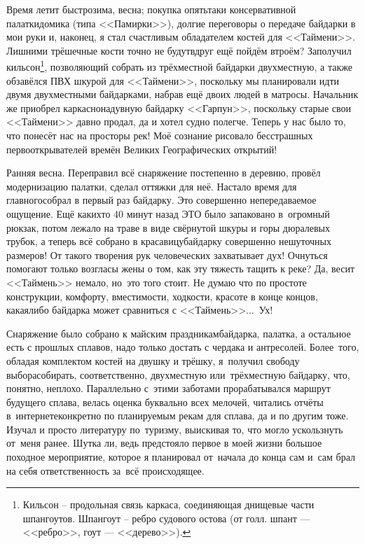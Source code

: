 Время летит быстро\mdash зима, весна; покупка опять\sdash таки консервативной палатки\sdash домика (типа <<Памирки>>), долгие переговоры о передаче байдарки в мои руки и, наконец, я стал счастливым обладателем костей для <<Таймени>>. Лишними трёшечные кости точно не будут\mdash вдруг ещё пойдём втроём? Заполучил кильсон\footnote{Кильсон -- продольная связь каркаса, соединяющая днищевые части шпангоутов. Шпангоут -- ребро судового остова (от голл. шпант — <<ребро>>, гоут — <<дерево>>).}, позволяющий собрать из трёхместной байдарки двухместную, а также обзавёлся ПВХ шкурой для <<Таймени>>, поскольку мы планировали идти двумя двухместными байдарками, набрав ещё двоих людей в матросы. Начальник же приобрел каркасно\sdash надувную байдарку <<Гарпун>>, поскольку старые свои <<Таймени>> давно продал, да и хотел судно полегче. Теперь у нас было то, что понесёт нас на просторы рек! Моё сознание рисовало бесстрашных первооткрывателей времён Великих Географических открытий!

Ранняя весна. Переправил всё снаряжение постепенно в деревню, провёл модернизацию палатки, сделал оттяжки для неё. Настало время для главного\mdash собрал в первый раз байдарку. Это совершенно непередаваемое ощущение. Ещё каких\sdash то 40 минут назад ЭТО было запаковано в~огромный рюкзак, потом лежало на траве в виде свёрнутой шкуры и горы дюралевых трубок, а теперь всё собрано в красавицу\sdash байдарку совершенно нешуточных размеров! От такого творения рук человеческих захватывает дух! Очнуться помогают только возгласы жены о том, как эту тяжесть тащить к реке? Да, весит <<Таймень>> немало, но~это того стоит. Не думаю что по простоте конструкции, комфорту, вместимости, ходкости, красоте в конце концов, какая\sdash либо байдарка может сравниться с <<Таймень>>$\ldots$~Ух! 

Снаряжение было собрано к майским праздникам\mdash байдарка, палатка, а остальное есть с прошлых сплавов, надо только достать с чердака и антресолей. Более~того, обладая комплектом костей на двушку и трёшку, я~получил свободу выбора\mdash собирать, соответственно, двухместную или~трёхместную байдарку, что, понятно, неплохо. Параллельно с~этими заботами прорабатывался маршрут будущего сплава, велась оценка буквально всех мелочей, читались отчёты в~интернете\mdash конкретно по планируемым рекам для сплава, да и по другим тоже. Изучал и просто литературу по~туризму, выискивая то, что могло ускользнуть от~меня ранее. Шутка ли, ведь предстояло первое в моей жизни большое походное мероприятие, которое я планировал от~начала до конца сам и~сам брал на себя ответственность за~всё происходящее.

